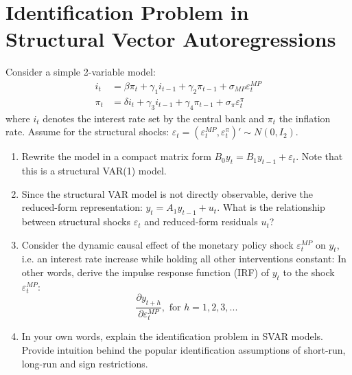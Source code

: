 \documentclass[a4paper]{scrartcl}
\begin{document}
\section{Identification Problem in Structural Vector Autoregressions}
Consider a simple 2-variable model:
\begin{align*}
i_t &=  \beta \pi_t + \gamma_1 i_{t-1} + \gamma_2 \pi_{t-1} + \sigma_{MP} \varepsilon_t^{MP} \\
\pi_t &=  \delta i_t + \gamma_3 i_{t-1} + \gamma_4 \pi_{t-1} + \sigma_{\pi} \varepsilon_t^{\pi}
\end{align*}
where $i_t$ denotes the interest rate set by the central bank and $\pi_t$ the inflation rate. Assume 
for the structural shocks: $\varepsilon_{t}=(\varepsilon_t^{MP}, \varepsilon_t^{\pi})' \sim N(0,I_2)$.
\begin{enumerate}
	\item Rewrite the model in a compact matrix form $B_0 y_t = B_1 y_{t-1} + \varepsilon_{t}$. Note that this is a structural VAR(1) model.
	\item Since the structural VAR model is not directly observable, derive the reduced-form representation: $y_t=A_1 y_{t-1} + u_t$. What is the relationship between structural shocks $\varepsilon_t$ and reduced-form residuals $u_t$?
	\item Consider the dynamic causal effect of the monetary policy shock $\varepsilon_t^{MP}$ on $y_t$, i.e. an interest rate increase while holding all other interventions constant: In other words, derive the impulse response function (IRF) of $y_t$ to the shock $\varepsilon_t^{MP}$: $$\frac{\partial y_{t+h}}{\partial \varepsilon_t^{MP}}, \text{ for } h=1,2,3,...$$
	\item In your own words, explain the identification problem in SVAR models. Provide intuition behind the popular identification assumptions of short-run, long-run and sign restrictions.
\end{enumerate}
\newpage
\end{document}
